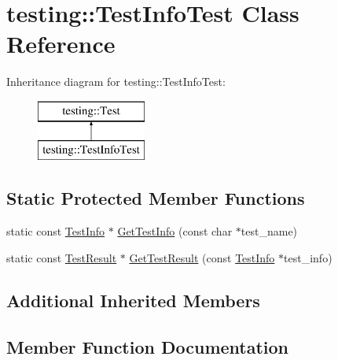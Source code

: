 \hypertarget{classtesting_1_1_test_info_test}{}\section{testing\+:\+:Test\+Info\+Test Class Reference}
\label{classtesting_1_1_test_info_test}
Inheritance diagram for testing\+:\+:Test\+Info\+Test\+:\begin{figure}[H]
\begin{center}
\leavevmode
\includegraphics[height=2.000000cm]{classtesting_1_1_test_info_test}
\end{center}
\end{figure}
\subsection*{Static Protected Member Functions}
\begin{DoxyCompactItemize}
\item 
static const \hyperlink{classtesting_1_1_test_info}{Test\+Info} $\ast$ \hyperlink{classtesting_1_1_test_info_test_a4140c1302bf53c7f1375a23923624f04}{Get\+Test\+Info} (const char $\ast$test\+\_\+name)
\item 
static const \hyperlink{classtesting_1_1_test_result}{Test\+Result} $\ast$ \hyperlink{classtesting_1_1_test_info_test_a154b3679b1aa00ad037ce46eb60d18c3}{Get\+Test\+Result} (const \hyperlink{classtesting_1_1_test_info}{Test\+Info} $\ast$test\+\_\+info)
\end{DoxyCompactItemize}
\subsection*{Additional Inherited Members}


\subsection{Member Function Documentation}
\hypertarget{classtesting_1_1_test_info_test_a4140c1302bf53c7f1375a23923624f04}{}
